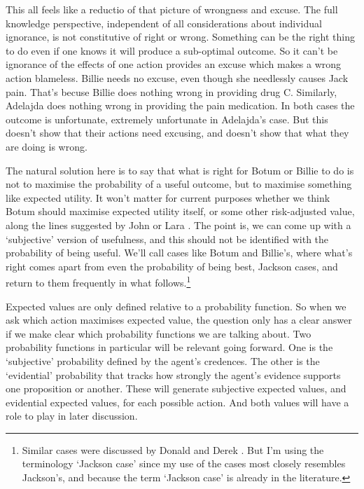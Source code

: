 This all feels like a reductio of that picture of wrongness and excuse. The full knowledge perspective, independent of all considerations about individual ignorance, is not constitutive of right or wrong. Something can be the right thing to do even if one knows it will produce a sub-optimal outcome. So it can't be ignorance of the effects of one action provides an excuse which makes a wrong action blameless. \gls{Billie} needs no excuse, even though she needlessly causes \gls{Jack} pain. That's becuse \gls{Billie} does nothing wrong in providing drug C. Similarly, \gls{Adelajda} does nothing wrong in providing the pain medication. In both cases the outcome is unfortunate, extremely unfortunate in \gls{Adelajda}'s case. But this doesn't show that their actions need excusing, and doesn't show that what they are doing is wrong.

The natural solution here is to say that what is right for \gls{Botum} or \gls{Billie} to do is not to maximise the probability of a useful outcome, but to maximise something like expected utility. It won't matter for current purposes whether we think \gls{Botum} should maximise expected utility itself, or some other risk-adjusted value, along the lines suggested by John \citet{Quiggin1982} or Lara \citet{BuchakRisk}. The point is, we can come up with a `subjective' version of usefulness, and this should not be identified with the probability of being useful. We'll call cases like \gls{Botum} and \gls{Billie}'s, where what's right comes apart from even the probability of being best, Jackson cases, and return to them frequently in what follows.\footnote{Similar cases were discussed by Donald \citet{Regan1980} and Derek \citet{Parfit1984}. But I'm using the terminology `Jackson case' since my use of the cases most closely resembles Jackson's, and because the term `Jackson case' is already in the literature.}

Expected values are only defined relative to a probability function. So when we ask which action maximises expected value, the question only has a clear answer if we make clear which probability functions we are talking about. Two probability functions in particular will be relevant going forward. One is the `subjective' probability defined by the agent's credences. The other is the `evidential' probability that tracks how strongly the agent's evidence supports one proposition or another. These will generate subjective expected values, and evidential expected values, for each possible action. And both values will have a role to play in later discussion.

